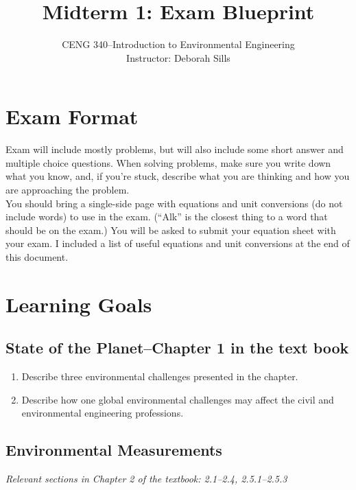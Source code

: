 \documentclass[12pt,letterpaper]{article}
\begin{document}
\setlength{\parindent}{0cm} 


\frenchspacing

\title {Midterm 1: Exam Blueprint} 
\author {CENG 340--Introduction to Environmental Engineering\\
Instructor: Deborah Sills\\}
 
\maketitle


\section *{Exam Format}
Exam will include mostly problems, but will also include some short answer and multiple choice questions.  When solving problems, make sure you write down what you know, and, if you're stuck, describe what you are thinking and how you are approaching the problem.\\

You should bring a single-side page with equations and unit conversions (do not include words) to use in the exam.  (``Alk'' is the closest thing to a word that should be on the exam.) You will be asked to submit your equation sheet with your exam. I included a list of useful equations and unit conversions at the end of this document.

\section *{Learning Goals}
\subsection *{State of the Planet--Chapter 1 in the text book}

\begin{enumerate}
\item Describe three environmental challenges presented in the chapter.
\item Describe how one global environmental challenges may affect the civil and environmental engineering professions.


\end{enumerate}

\subsection *{Environmental Measurements}
\emph{Relevant sections in Chapter 2 of the textbook: 2.1--2.4, 2.5.1--2.5.3}\\
\end{document}

